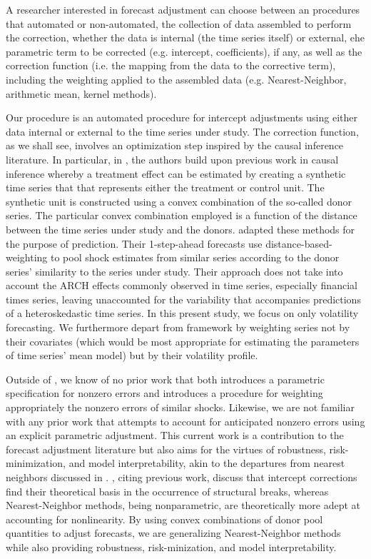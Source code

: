 \documentclass[11pt]{article}
\theoremstyle{definition}
\begin{document}
A researcher interested in forecast adjustment can choose between an procedures that automated or non-automated, the collection of data assembled to perform the correction, whether the data is internal (the time series itself) or external, ehe parametric term to be corrected (e.g. intercept, coefficients), if any, as well as the correction function (i.e. the mapping from the data to the corrective term), including the weighting applied to the assembled data (e.g. Nearest-Neighbor, arithmetic mean, kernel methods).

Our procedure is an automated procedure for intercept adjustments using either data internal or external to the time series under study.  The correction function, as we shall see, involves an optimization step inspired by the causal inference literature.  In particular, in \citet{abadie2010synthetic}, the authors build upon previous work in causal inference whereby a treatment effect can be estimated by creating a synthetic time series that that represents either the treatment or control unit.  The synthetic unit is constructed using a convex combination of the so-called donor series.  The particular convex combination employed is a function of the distance between the time series under study and the donors.  \citet{lin2021minimizing} adapted these methods for the purpose of prediction.  Their 1-step-ahead forecasts use distance-based-weighting to pool shock estimates from similar series according to the donor series' similarity to the series under study.  Their approach does not take into account the ARCH effects commonly observed in time series, especially financial times series, leaving unaccounted for the variability that accompanies predictions of a heteroskedastic time series.  In this present study, we focus on only volatility forecasting.  We furthermore depart from \citet{lin2021minimizing} framework by weighting series not by their covariates (which would be most appropriate for estimating the parameters of time series' mean model) but by their volatility profile.  

Outside of \citet{lin2021minimizing}, we know of no prior work that both introduces a parametric specification for nonzero errors and introduces a procedure for weighting appropriately the nonzero errors of similar shocks.  Likewise, we are not familiar with any prior work that attempts to account for anticipated nonzero errors using an explicit parametric adjustment.  This current work is a contribution to the forecast adjustment literature but also aims for the virtues of robustness, risk-minimization, and model interpretability, akin to the departures from nearest neighbors discussed in \citet{abadie2021penalized}.  \citet{guerron2017macroeconomic}, citing previous work, discuss that intercept corrections find their theoretical basis in the occurrence of structural breaks, whereas Nearest-Neighbor methods, being nonparametric, are theoretically more adept at accounting for nonlinearity.  By using convex combinations of donor pool quantities to adjust forecasts, we are generalizing Nearest-Neighbor methods while also providing robustness, risk-minization, and model interpretability.
\end{document}
